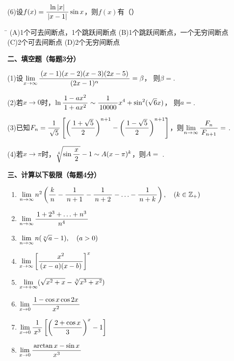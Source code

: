 (6)\;设$f(x)=\df{\ln|x|}{|x-1|}\sin x$，则$f(x)$有（\quad）%

\begin{tabbing}
	\hspace{8cm}\=\kill
	\quad\quad\quad(A)\;1个可去间断点，1个跳跃间断点 
	\> (B)\;1个跳跃间断点，一个无穷间断点 \\ 
	\quad\quad\quad(C)\;2个可去间断点
	\>	(D)\;2个无穷间断点 
\end{tabbing}

{\bf 二、填空题（每题3分）}

(1)\;设$\limx{\infty}\df{(x-1)(x-2)(x-3)(2x-5)}{(2x-1)^{\alpha}}=\beta$，
则$\beta=$\underline{\hspace{4cm}}.

(2)\;若$x\to0$时，$\ln\df{1-ax^2}{1+ax^2}\sim\df1{10000}x^4+\sin^2(\sqrt6x)$，
则$a=$\underline{\hspace{4cm}}.

(3)\;已知$F_n=\df1{\sqrt5}\left[\left(\df{1+\sqrt5}2\right)^{n+1}
-\left(\df{1-\sqrt5}2\right)^{n+1}\right]$，则$\limn\df{F_n}{F_{n+1}}=$
\underline{\hspace{4cm}}.

(4)\;若$x\to\pi$时，$\sqrt[4]{\sin\df x2}-1\sim A(x-\pi)^k$，则$A=$
\underline{\hspace{4cm}}.

{\bf 三、计算以下极限（每题4分）}
\begin{enumerate}[(1)]
  \setlength{\itemindent}{1cm}
  \item $\limn n^2\left(\df
  kn-\df1{n+1}-\df1{n+2}-\ldots-\df1{n+k}\right),\quad(k\in\mathbb{Z}_+)$
  \item $\limn\df{1+2^3+\ldots+n^3}{n^4}$
  \item $\limn n(\sqrt[n]a-1),\quad(a>0)$
  \item $\limx{\infty}\left[\df{x^2}{(x-a)(x-b)}\right]^x$
  \item $\limx{+\infty}(\sqrt{x^2+x}-\sqrt[3]{x^3+x^2})$ 
  \item $\limx{0}\df{1-\cos x\cos 2x}{x^2}$
  \item $\limx{0}\df1{x^3}\left[\left(\df{2+\cos x}3\right)^x-1\right]$
  \item $\limx{0}\df{\arctan x-\sin x}{x^3}$
\end{enumerate}

